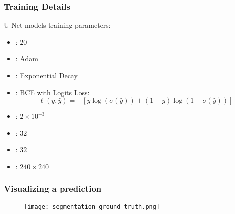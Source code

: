 \documentclass[../presentation.tex]{subfiles} %
\begin{document}
\begin{frame}[t]

	\frametitle{Training Details}

	U-Net models training parameters:
	\vspace{0.2cm}

	\begin{itemize}
		\setlength{\itemsep}{1.5ex}
		\item {}: $20$
		\item {}: Adam 
		\item {}: Exponential Decay 
		\item {}: BCE with Logits Loss:
			\begin{equation*}
				\ell(y, \hat{y}) = - \left[ 
					y \log(\sigma(\hat{y})) + (1 - y) \log(1 - \sigma(\hat{y}))
				\right]
			\end{equation*}
		\item {}: $2 \times 10^{-3}$
		\item {}: $32$ 
		\item {}: $32$
		\item {}: $240 \times 240$
	\end{itemize}

\end{frame}


\begin{frame}

	\frametitle{Visualizing a prediction}

	\vspace{-2ex}

		\begin{figure}
			\centering
			\texttt{[image: segmentation-ground-truth.png]}
		\end{figure}

\end{frame}
\end{document}
